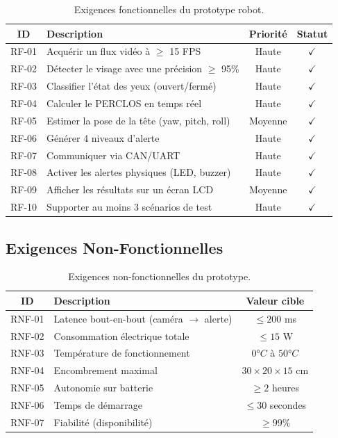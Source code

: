\begin{table}[H]
\centering
\caption{Exigences fonctionnelles du prototype robot.}
\label{tab:req_fonctionnelles}
\renewcommand{\arraystretch}{1.4}
\begin{tabularx}{\textwidth}{|c|X|c|c|}
\hline
\rowcolor{stellantisblue!15}
\textbf{ID} & \textbf{Description} & \textbf{Priorité} & \textbf{Statut} \\
\hline
RF-01 & Acquérir un flux vidéo à $\geq$ 15 FPS & Haute & $\checkmark$ \\
\hline
RF-02 & Détecter le visage avec une précision $\geq$ 95\% & Haute & $\checkmark$ \\
\hline
RF-03 & Classifier l'état des yeux (ouvert/fermé) & Haute & $\checkmark$ \\
\hline
RF-04 & Calculer le PERCLOS en temps réel & Haute & $\checkmark$ \\
\hline
RF-05 & Estimer la pose de la tête (yaw, pitch, roll) & Moyenne & $\checkmark$ \\
\hline
RF-06 & Générer 4 niveaux d'alerte & Haute & $\checkmark$ \\
\hline
RF-07 & Communiquer via CAN/UART & Haute & $\checkmark$ \\
\hline
RF-08 & Activer les alertes physiques (LED, buzzer) & Haute & $\checkmark$ \\
\hline
RF-09 & Afficher les résultats sur un écran LCD & Moyenne & $\checkmark$ \\
\hline
RF-10 & Supporter au moins 3 scénarios de test & Haute & $\checkmark$ \\
\hline
\end{tabularx}
\end{table}

\subsection{Exigences Non-Fonctionnelles}

\begin{table}[H]
\centering
\caption{Exigences non-fonctionnelles du prototype.}
\label{tab:req_non_fonctionnelles}
\renewcommand{\arraystretch}{1.4}
\begin{tabularx}{\textwidth}{|c|X|c|}
\hline
\rowcolor{stellantisblue!15}
\textbf{ID} & \textbf{Description} & \textbf{Valeur cible} \\
\hline
RNF-01 & Latence bout-en-bout (caméra $\rightarrow$ alerte) & $\leq 200$ ms \\
\hline
RNF-02 & Consommation électrique totale & $\leq 15$ W \\
\hline
RNF-03 & Température de fonctionnement & $0°C$ à $50°C$ \\
\hline
RNF-04 & Encombrement maximal & $30 \times 20 \times 15$ cm \\
\hline
RNF-05 & Autonomie sur batterie & $\geq 2$ heures \\
\hline
RNF-06 & Temps de démarrage & $\leq 30$ secondes \\
\hline
RNF-07 & Fiabilité (disponibilité) & $\geq 99\%$ \\
\hline
\end{tabularx}
\end{table}

